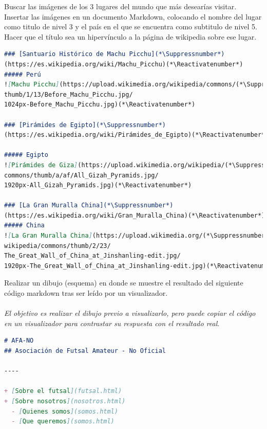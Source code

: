 \documentclass[12pt, addpoints]{../../common/epyl_exam_template}
\begin{document}
\begin{questions}
  \question
    Buscar las imágenes de los 3 lugares del mundo que más desearías
    visitar. Insertar las imágenes en un documento Markdown, colocando el
    nombre del lugar como titulo de nivel 3 y el país en el que se encuentra
    como subtitulo de nivel 5. Hacer que el título sea un hipervínculo a
    la página de wikipedia sobre ese lugar.

    \begin{solution}
      \begin{lstlisting}[language=Markdown]
### [Santuario Histórico de Machu Picchu](*\Suppressnumber*)
(https://es.wikipedia.org/wiki/Machu_Picchu)(*\Reactivatenumber*)
##### Perú
![Machu Picchu](https://upload.wikimedia.org/wikipedia/commons/(*\Suppressnumber*)
thumb/1/13/Before_Machu_Picchu.jpg/
1024px-Before_Machu_Picchu.jpg)(*\Reactivatenumber*)

### [Pirámides de Egipto](*\Suppressnumber*)
(https://es.wikipedia.org/wiki/Pirámides_de_Egipto)(*\Reactivatenumber*)

##### Egipto
![Pirámides de Giza](https://upload.wikimedia.org/wikipedia/(*\Suppressnumber*)
commons/thumb/a/af/All_Gizah_Pyramids.jpg/
1920px-All_Gizah_Pyramids.jpg)(*\Reactivatenumber*)

### [La Gran Muralla China](*\Suppressnumber*)
(https://es.wikipedia.org/wiki/Gran_Muralla_China)(*\Reactivatenumber*)
##### China
![La Gran Muralla China](https://upload.wikimedia.org/(*\Suppressnumber*)
wikipedia/commons/thumb/2/23/
The_Great_Wall_of_China_at_Jinshanling-edit.jpg/
1920px-The_Great_Wall_of_China_at_Jinshanling-edit.jpg)(*\Reactivatenumber*)
      \end{lstlisting}
    \end{solution}

  \question
    Realizar un dibujo (esquema) en donde se muestre el resultado del
    siguiente código markdown tras ser leído por un visualizador.\\~\\
    \textit{El objetivo es realizar el dibujo previo a visualizarlo, pero
    puede copiar el código en un visualizador para contrastar su respuesta
    con el resultado real}.

    \begin{lstlisting}[language=markdown]
# AFA-NO
## Asociación de Futsal Amateur - No Oficial

----

+ [Sobre el futsal](futsal.html)
+ [Sobre nosotros](nosotros.html)
  - [Quienes somos](somos.html)
  - [Que queremos](somos.html)


\end{lstlisting}
\end{questions}
\end{document}
